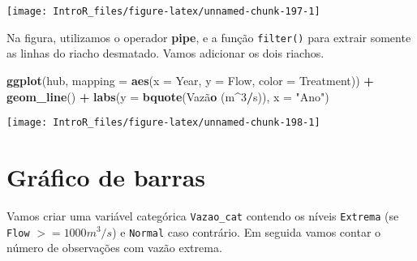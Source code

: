 \documentclass[
]{book}
\newenvironment{Shaded}{\begin{snugshade}}{\end{snugshade}}
\newcommand{\DataTypeTok}[1]{\textcolor[rgb]{0.13,0.29,0.53}{#1}}
\newcommand{\DecValTok}[1]{\textcolor[rgb]{0.00,0.00,0.81}{#1}}
\newcommand{\KeywordTok}[1]{\textcolor[rgb]{0.13,0.29,0.53}{\textbf{#1}}}
\newcommand{\NormalTok}[1]{#1}
\newcommand{\OperatorTok}[1]{\textcolor[rgb]{0.81,0.36,0.00}{\textbf{#1}}}
\newcommand{\StringTok}[1]{\textcolor[rgb]{0.31,0.60,0.02}{#1}}
\begin{document}
\begin{center}\texttt{[image: IntroR\_files/figure-latex/unnamed-chunk-197-1]} \end{center}

Na figura, utilizamos o operador \textbf{pipe}, e a função \texttt{filter()} para extrair somente as linhas do riacho desmatado. Vamos adicionar os dois riachos.

\begin{Shaded}
\begin{Highlighting}[]
\KeywordTok{ggplot}\NormalTok{(hub, }\DataTypeTok{mapping =} \KeywordTok{aes}\NormalTok{(}\DataTypeTok{x =}\NormalTok{ Year, }\DataTypeTok{y =}\NormalTok{ Flow, }\DataTypeTok{color =}\NormalTok{ Treatment)) }\OperatorTok{+}
\StringTok{  }\KeywordTok{geom_line}\NormalTok{() }\OperatorTok{+}
\StringTok{  }\KeywordTok{labs}\NormalTok{(}\DataTypeTok{y =} \KeywordTok{bquote}\NormalTok{(Vazã}\KeywordTok{o}\NormalTok{ (m}\OperatorTok{^}\DecValTok{3}\OperatorTok{/}\NormalTok{s)),}
         \DataTypeTok{x =} \StringTok{"Ano"}\NormalTok{)}
\end{Highlighting}
\end{Shaded}

\begin{center}\texttt{[image: IntroR\_files/figure-latex/unnamed-chunk-198-1]} \end{center}

\hypertarget{gruxe1fico-de-barras-2}{%
\section{Gráfico de barras}\label{gruxe1fico-de-barras-2}}

Vamos criar uma variável categórica \texttt{Vazao\_cat} contendo os níveis \texttt{Extrema} (se \texttt{Flow} \(>= 1000 m^3/s\)) e \texttt{Normal} caso contrário. Em seguida vamos contar o número de observações com vazão extrema.

\begin{Shaded}
\end{Shaded}
\end{document}
